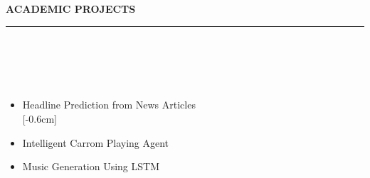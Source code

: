 \documentclass[a4paper,10pt]{article}
\newcommand{\isep}{-2 pt}
\newcommand{\lsep}{-0.5cm}
\newcommand{\resheading}[1]{{\small
        {
            \begin{minipage}
                {0.975\textwidth}\textbf{{\textsc{#1 \vphantom{p\^{E}} }}}
                \\[-0.3cm]
                \hrule
            \end{minipage}
            \\[-0.5cm]
        }
 }}
\begin{document}
\resheading{\textbf{\large ACADEMIC PROJECTS}}\\[\lsep]
\\[-0.4cm]
\begin{itemize}

\item Headline Prediction from News Articles \\ 
    [-0.6cm]

\item Intelligent Carrom Playing Agent
    \\ [-0.6cm]



\item Music Generation Using LSTM
    \\ [-0.6cm]



\end{itemize}
\end{document}
